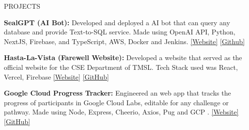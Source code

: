 \documentclass{resume} %
\begin{document}

\begin{rSection}{PROJECTS}
\vspace{-1.25em}

\item \textbf{SealGPT (AI Bot):} {Developed and deployed a AI bot that can query any database and provide Text-to-SQL service. Made using OpenAI API, Python, NextJS, Firebase, and TypeScript, AWS, Docker and Jenkins.}
\href{https://gpt.iamseal.tech/}{[Website]}
\href{https://github.com/Sabyasachi-Seal/SealGPT}{[Github]}

\item \textbf{Hasta-La-Vista (Farewell Website):} {Developed a website that served as the official website for the CSE Department of TMSL. Tech Stack used was React, Vercel, Firebase}
\href{https://hasta-la-vista-cse-tmsl.vercel.app/}{[Website]}
\href{https://github.com/Sabyasachi-Seal/HastaLaVista-2K23}{[GitHub]}

\item \textbf{Google Cloud Progress Tracker:} {Engineered an web app that tracks the progress of participants in Google Cloud Labs, editable for any challenge or pathway. Made using Node, Express, Cheerio, Axios, Pug and GCP .} 
\href {https://qwiklabsprogresstracker.onrender.com/}{[Website]}
\href{https://github.com/Sabyasachi-Seal/QwiklabsProgressTracker}{[GitHub]}
\end{rSection} 
\end{document}
